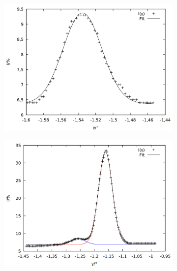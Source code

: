 \begin{figure}[h]
\begin{subfigure}[c]{0.49\linewidth}
  	\includegraphics[width=\linewidth]{data/Balmer/out_blue0.png}
  	\label{fig:blue0}
  \end{subfigure}
  \begin{subfigure}[c]{0.49\linewidth}
  	\centering
  	\includegraphics[width=\linewidth]{data/Balmer/out_blue1.png}
  	\label{fig:blue1}
  \end{subfigure}
  \begin{subfigure}[c]{0.49\linewidth}
  	\centering

\end{subfigure}
\end{figure}
